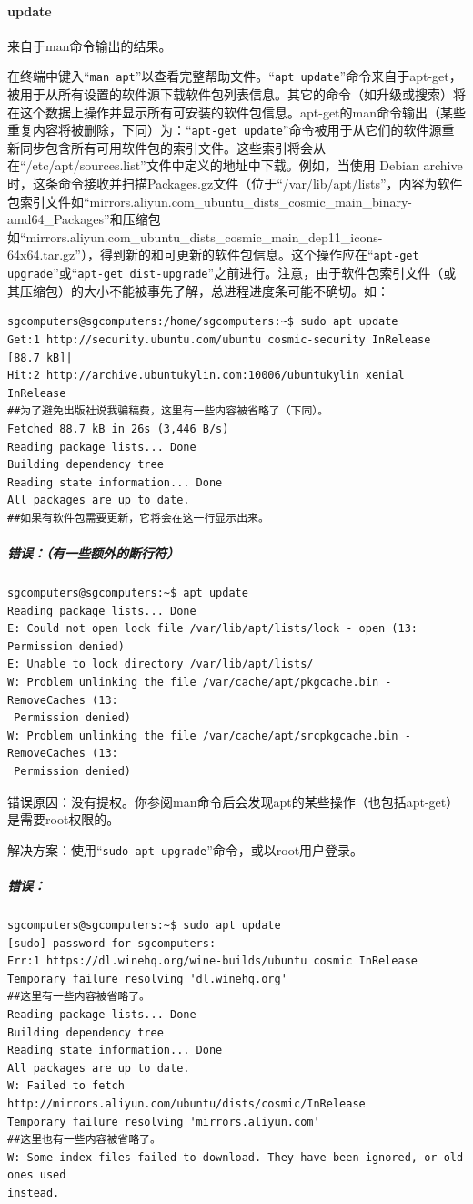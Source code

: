\paragraph{update} 
来自于man命令输出的结果。 \par 在终端中键入“\verb|man apt|”以查看完整帮助文件。“\verb|apt update|”命令来自于apt-get，被用于从所有设置的软件源下载软件包列表信息。其它的命令（如升级或搜索）将在这个数据上操作并显示所有可安装的软件包信息。apt-get的man命令输出（某些重复内容将被删除，下同）为：“\verb|apt-get update|”命令被用于从它们的软件源重新同步包含所有可用软件包的索引文件。这些索引将会从在“/etc/apt/sources.list”文件中定义的地址中下载。例如，当使用 Debian archive时，这条命令接收并扫描Packages.gz文件（位于“/var/lib/apt/lists”，内容为软件包索引文件如“mirrors.aliyun.com\_ubuntu\_dists\_cosmic\_main\_binary-amd64\_Packages”和压缩包如“mirrors.aliyun.com\_ubuntu\_dists\_cosmic\_main\_dep11\_icons-64x64.tar.gz”），得到新的和可更新的软件包信息。这个操作应在“\verb|apt-get upgrade|”或“\verb|apt-get dist-upgrade|”之前进行。注意，由于软件包索引文件（或其压缩包）的大小不能被事先了解，总进程进度条可能不确切。如：
\begin{verbatim}
sgcomputers@sgcomputers:/home/sgcomputers:~$ sudo apt update
Get:1 http://security.ubuntu.com/ubuntu cosmic-security InRelease [88.7 kB]|
Hit:2 http://archive.ubuntukylin.com:10006/ubuntukylin xenial InRelease
##为了避免出版社说我骗稿费，这里有一些内容被省略了（下同）。
Fetched 88.7 kB in 26s (3,446 B/s)
Reading package lists... Done
Building dependency tree
Reading state information... Done
All packages are up to date.
##如果有软件包需要更新，它将会在这一行显示出来。
\end{verbatim}
\subparagraph{错误：（有一些额外的断行符）}
\begin{verbatim}
sgcomputers@sgcomputers:~$ apt update
Reading package lists... Done
E: Could not open lock file /var/lib/apt/lists/lock - open (13: Permission denied)
E: Unable to lock directory /var/lib/apt/lists/
W: Problem unlinking the file /var/cache/apt/pkgcache.bin - RemoveCaches (13:
 Permission denied)
W: Problem unlinking the file /var/cache/apt/srcpkgcache.bin - RemoveCaches (13:
 Permission denied)
\end{verbatim} \par
错误原因：没有提权。你参阅man命令后会发现apt的某些操作（也包括apt-get）是需要root权限的。  \par
解决方案：使用“\verb|sudo apt upgrade|”命令，或以root用户登录。  \par
\subparagraph{错误：}
\begin{verbatim}
sgcomputers@sgcomputers:~$ sudo apt update
[sudo] password for sgcomputers:
Err:1 https://dl.winehq.org/wine-builds/ubuntu cosmic InRelease
Temporary failure resolving 'dl.winehq.org'
##这里有一些内容被省略了。
Reading package lists... Done
Building dependency tree
Reading state information... Done
All packages are up to date.
W: Failed to fetch http://mirrors.aliyun.com/ubuntu/dists/cosmic/InRelease
Temporary failure resolving 'mirrors.aliyun.com'
##这里也有一些内容被省略了。
W: Some index files failed to download. They have been ignored, or old ones used
instead.
\end{verbatim} \par

